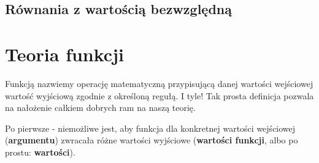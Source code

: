 \documentclass[11pt]{article}
\theoremstyle{definition}
\numberwithin{zad}{section}
\begin{document}
\subsection{Równania z wartością bezwzględną}



\section{Teoria funkcji}

Funkcją nazwiemy operację matematyczną przypisującą danej wartości wejściowej wartość wyjściową zgodnie z określoną regułą. I tyle! Tak prosta definicja pozwala na nałożenie całkiem dobrych ram na naszą teorię.

Po pierwsze - niemożliwe jest, aby funkcja dla konkretnej wartości wejściowej (\textbf{argumentu}) zwracała różne wartości wyjściowe (\textbf{wartości funkcji}, albo po prostu: \textbf{wartości}).
\end{document}
